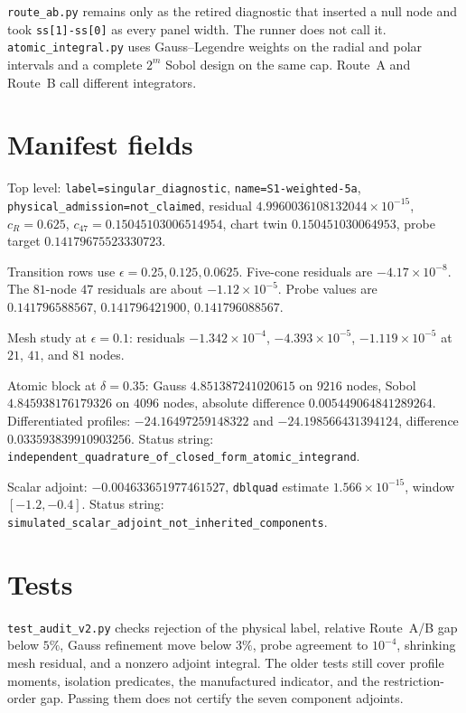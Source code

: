 \documentclass[11pt,letterpaper]{article}
\begin{document}
\texttt{route\_ab.py} remains only as the retired diagnostic that
inserted a null node and took \texttt{ss[1]-ss[0]} as every panel
width. The runner does not call it.
\texttt{atomic\_integral.py} uses Gauss--Legendre weights on the
radial and polar intervals and a complete \(2^{m}\) Sobol design
on the same cap. Route~A and Route~B call different integrators.

\section{Manifest fields}
Top level:
\texttt{label=singular\_diagnostic},
\texttt{name=S1-weighted-5a},
\texttt{physical\_admission=not\_claimed},
residual \(4.9960036108132044\times 10^{-15}\),
\(c_R=0.625\),
\(c_{47}=0.15045103006514954\),
chart twin \(0.150451030064953\),
probe target \(0.14179675523330723\).

Transition rows use \(\epsilon=0.25,0.125,0.0625\).
Five-cone residuals are \(-4.17\times 10^{-8}\).
The \(81\)-node \(47\) residuals are about \(-1.12\times 10^{-5}\).
Probe values are \(0.141796588567\), \(0.141796421900\),
\(0.141796088567\).

Mesh study at \(\epsilon=0.1\):
residuals \(-1.342\times 10^{-4}\), \(-4.393\times 10^{-5}\),
\(-1.119\times 10^{-5}\) at \(21\), \(41\), and \(81\) nodes.

Atomic block at \(\delta=0.35\):
Gauss \(4.851387241020615\) on \(9216\) nodes,
Sobol \(4.845938176179326\) on \(4096\) nodes,
absolute difference \(0.005449064841289264\).
Differentiated profiles:
\(-24.16497259148322\) and \(-24.198566431394124\),
difference \(0.033593839910903256\).
Status string:
\texttt{independent\_quadrature\_of\_closed\_form\_atomic\_integrand}.

Scalar adjoint:
\(-0.004633651977461527\),
\texttt{dblquad} estimate \(1.566\times 10^{-15}\),
window \([-1.2,-0.4]\).
Status string:
\texttt{simulated\_scalar\_adjoint\_not\_inherited\_components}.

\section{Tests}
\texttt{test\_audit\_v2.py} checks rejection of the physical label,
relative Route~A/B gap below \(5\%\), Gauss refinement move below
\(3\%\), probe agreement to \(10^{-4}\), shrinking mesh residual,
and a nonzero adjoint integral.
The older tests still cover profile moments, isolation predicates,
the manufactured indicator, and the restriction-order gap.
Passing them does not certify the seven component adjoints.
\end{document}
